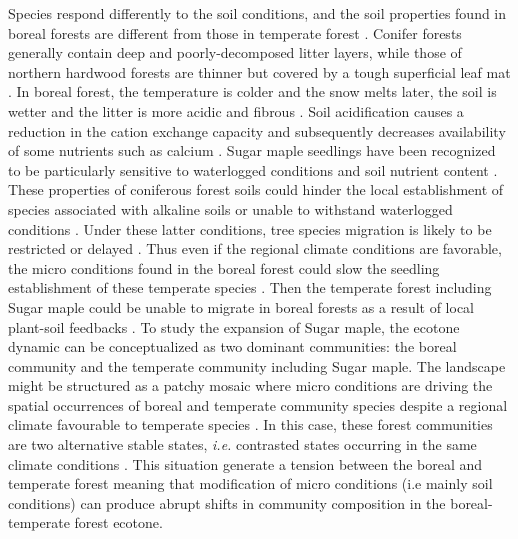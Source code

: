 Species respond differently to the soil conditions, and the soil
properties found in boreal forests are different from those in temperate
forest \cite{Lafleur2010,Barras1998,Goldblum2010,Demers1998}. Conifer forests
generally contain deep and poorly-decomposed litter layers, while those of
northern hardwood forests are thinner but covered by a tough superficial leaf
mat \cite{Barras1998}. In boreal forest, the temperature is colder and the
snow melts later, the soil is wetter and the litter is more acidic and fibrous
\cite{Lafleur2010,Goldblum2010}. Soil acidification causes a reduction in
the cation exchange capacity and subsequently decreases availability of some
nutrients such as calcium \cite{Moore2008}. Sugar maple seedlings have been
recognized to be particularly sensitive to waterlogged conditions and soil nutrient
content \cite{Moore2008,Lafleur2010,Cleavitt2011}. These properties of
coniferous forest soils could hinder the local establishment of species
associated with alkaline soils or unable to withstand waterlogged conditions
\cite{Lafleur2010}. Under these latter conditions, tree species migration is
likely to be restricted or delayed \cite{Lafleur2010}. Thus even if the
regional climate conditions are favorable, the micro conditions found in the
boreal forest could slow the seedling establishment of these temperate
species \cite{Kellman2004,Moore2008,Barras1998,Messier2011}. Then the
temperate forest including Sugar maple could be unable to migrate in
boreal forests as a result of local plant-soil feedbacks
\cite{McCarthyNeumann2012}. To study the expansion of Sugar maple, the ecotone
dynamic can be conceptualized as two dominant communities:
the boreal community and the temperate community including Sugar maple. The
landscape might be structured as a patchy mosaic where micro
conditions are driving the spatial occurrences of boreal and temperate
community species despite a regional climate favourable to temperate species
\cite{Goldblum2010,Fisichelli2013}. In this case, these forest communities are
two alternative stable states, \textit{i.e.} contrasted states occurring in the
same climate conditions \cite{scheffer2009critical}. This situation generate a
tension between the boreal and temperate forest meaning that modification of
micro conditions (i.e mainly soil conditions) can produce abrupt shifts in
community composition in the boreal-temperate forest ecotone.\\

